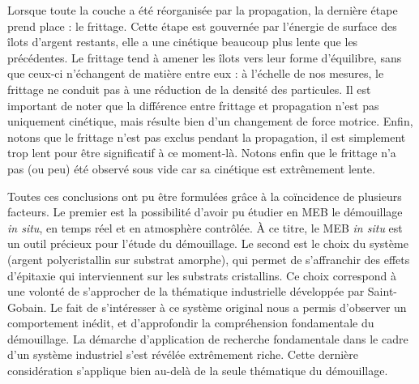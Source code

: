 Lorsque toute la couche a été réorganisée par la propagation, la dernière étape prend place : le frittage. Cette étape est gouvernée par l'énergie de surface des îlots d'argent restants, elle a une cinétique beaucoup plus lente que les précédentes. Le frittage tend à amener les îlots vers leur forme d'équilibre, sans que ceux-ci n'échangent de matière entre eux : à l'échelle de nos mesures, le frittage ne conduit pas à une réduction de la densité des particules. Il est important de noter que la différence entre frittage et propagation n'est pas uniquement cinétique, mais résulte bien d'un changement de force motrice. Enfin, notons que le frittage n'est pas exclus pendant la propagation, il est simplement trop lent pour être significatif à ce moment-là. Notons enfin que le frittage n'a pas (ou peu) été observé sous vide car sa cinétique est extrêmement lente.\par \vspace{12pt}
Toutes ces conclusions ont pu être formulées grâce à la coïncidence de plusieurs facteurs. Le premier est la possibilité d'avoir pu étudier en MEB le démouillage \textit{in situ}, en temps réel et en atmosphère contrôlée. À ce titre, le MEB \textit{in situ} est un outil précieux pour l'étude du démouillage. Le second est le choix du système (argent polycristallin sur substrat amorphe), qui permet de s'affranchir des effets d'épitaxie qui interviennent sur les substrats cristallins. Ce choix correspond à une volonté de s'approcher de la thématique industrielle développée par Saint-Gobain. Le fait de s'intéresser à ce système original nous a permis d'observer un comportement inédit, et d'approfondir la compréhension fondamentale du démouillage. La démarche d'application de recherche fondamentale dans le cadre d'un système industriel s'est révélée extrêmement riche. Cette dernière considération s'applique bien au-delà de la seule thématique du démouillage.\par 

\newpage



